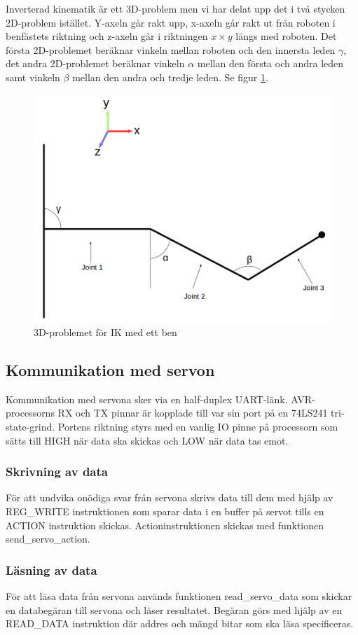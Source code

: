 \documentclass[a4paper,titlepage,12pt]{article}
\begin{document}
	Inverterad kinematik är ett 3D-problem men vi har delat upp det i två
    stycken 2D-problem istället. Y-axeln går rakt upp, x-axeln går rakt ut från
    roboten i benfästets riktning och z-axeln går i riktningen $x \times y$
    längs med roboten. Det första 2D-problemet beräknar vinkeln mellan roboten
    och den innersta leden $\gamma$, det andra 2D-problemet beräknar vinkeln
    $\alpha$ mellan den första och andra leden samt vinkeln $\beta$ mellan den
    andra och tredje leden. Se figur \ref{fig:ik}.
	
	
	\begin{figure}[h!]
		\centering
		\includegraphics[width=0.5\linewidth]{images/ik.png}
		\caption{3D-problemet för IK med ett ben
		\label{fig:ik}}
	\end{figure}

	\subsection{Kommunikation med servon}
	Kommunikation med servona sker via en half-duplex UART-länk. AVR-processorns RX
	och TX pinnar är kopplade till var sin port på en 74LS241 tri-state-grind. Portens riktning
	styrs med en vanlig IO pinne på processorn som sätts till HIGH när data ska skickas 
	och LOW när data tas emot. 

	\subsubsection{Skrivning av data}
	För att undvika onödiga svar från servona skrivs data till dem med hjälp av REG\_WRITE
	instruktionen som sparar data i en buffer på servot tills en ACTION instruktion skickas.
	Actioninstruktionen skickas med funktionen send\_servo\_action.
	
	\subsubsection{Läsning av data}
	För att läsa data från servona används funktionen read\_servo\_data som skickar en 
	databegäran till servona och läser resultatet. Begäran görs med hjälp av en
	READ\_DATA instruktion där addres och mängd bitar som ska läsa specificeras.
	
\end{document}
